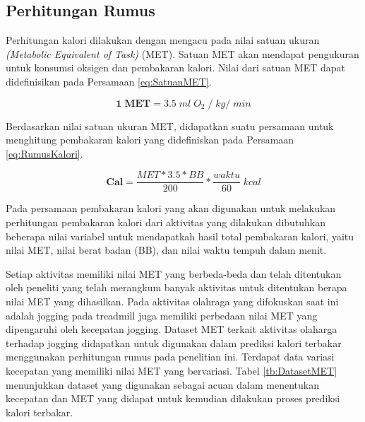\subsection{Perhitungan Rumus}
\label{subsec:PrediksiPerhitungan}

Perhitungan kalori dilakukan dengan mengacu pada nilai satuan ukuran \emph{(Metabolic Equivalent of Task)} (MET). Satuan MET akan mendapat pengukuran untuk konsumsi oksigen dan pembakaran kalori. Nilai dari satuan MET dapat didefinisikan pada Persamaan \ref{eq:SatuanMET}.

\begin{equation}
  \label{eq:SatuanMET}
  \mathbf{1 \; MET} = 3.5 \; ml \; O_2 \; / \; kg / \; min
\end{equation}

Berdasarkan nilai satuan ukuran MET, didapatkan suatu persamaan untuk menghitung pembakaran kalori yang didefiniskan pada Persamaan \ref{eq:RumusKalori}.

\begin{equation}
  \label{eq:RumusKalori}
  \mathbf{Cal} = \frac{MET * 3.5 * BB}{200} * \frac{waktu}{60} \; kcal
\end{equation}

Pada persamaan pembakaran kalori yang akan digunakan untuk melakukan perhitungan pembakaran kalori dari aktivitas yang dilakukan dibutuhkan beberapa nilai variabel untuk mendapatkah hasil total pembakaran kalori, yaitu nilai MET, nilai berat badan (BB), dan nilai waktu tempuh dalam menit.

Setiap aktivitas memiliki nilai MET yang berbeda-beda dan telah ditentukan oleh peneliti yang telah merangkum banyak aktivitas untuk ditentukan berapa nilai MET yang dihasilkan. Pada aktivitas olahraga yang difokuskan saat ini adalah jogging pada treadmill juga memiliki perbedaan nilai MET yang dipengaruhi oleh kecepatan jogging. Dataset MET terkait aktivitas olaharga terhadap jogging didapatkan untuk digunakan dalam prediksi kalori terbakar menggunakan perhitungan rumus pada penelitian ini. Terdapat data variasi kecepatan yang memiliki nilai MET yang bervariasi. Tabel \ref{tb:DatasetMET} menunjukkan dataset yang digunakan sebagai acuan dalam menentukan kecepatan dan MET yang didapat untuk kemudian dilakukan proses prediksi kalori terbakar.

